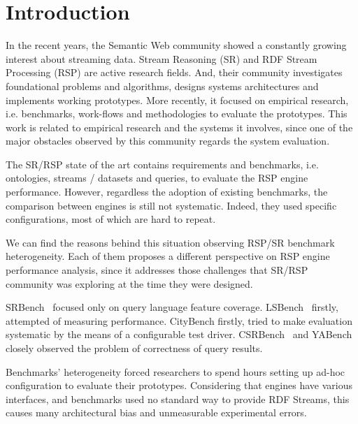 \section{Introduction}\label{sec:intro}


In the recent years, the Semantic Web 
community showed a constantly growing 
interest about streaming data.
Stream Reasoning (SR) and 
RDF Stream Processing (RSP) 
are active research fields.
And, their community investigates 
foundational problems 
and algorithms, designs
systems architectures and 
implements working prototypes.
More recently, it focused on empirical research, 
i.e. benchmarks, work-flows and methodologies 
to evaluate the prototypes. 
This work is related to empirical research 
and the systems it involves, 
since one of the major obstacles observed 
by this community regards the 
system evaluation.   
 
The SR/RSP state of the art contains requirements 
and benchmarks, i.e. ontologies, 
streams / datasets and queries, 
to evaluate the RSP engine performance. 
However, regardless the adoption of existing
benchmarks, the comparison 
between engines is still not systematic. 
Indeed, they used specific configurations, 
most of which are hard to repeat.   
 
We can find the reasons behind this situation 
observing RSP/SR benchmark heterogeneity.
Each of them proposes a different perspective
on RSP engine performance analysis, 
since it addresses those 
challenges that 
SR/RSP community was exploring 
at the time they were designed.   
 
SRBench~\cite{srbench} 
focused only on query language
feature coverage.
LSBench~\cite{lsbench} firstly, attempted
of measuring performance. CityBench 
firstly, tried to make evaluation systematic
by the means of a configurable test driver.
CSRBench~\cite{csrbench} 
and YABench~\cite{yabench} closely observed 
the problem of correctness of query results.

Benchmarks' heterogeneity forced
researchers to spend hours setting up 
ad-hoc configuration 
to evaluate their prototypes.
Considering that engines have various 
interfaces, and benchmarks used no standard way 
to provide RDF Streams, this causes 
many architectural bias 
and unmeasurable experimental errors.

